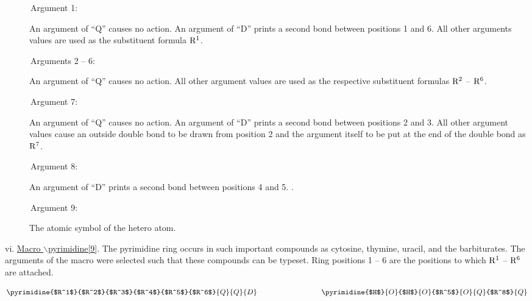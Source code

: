  \begin{description}
 \item[{\rm \ \ \ \ \ \ Argument 1:}] An argument of ``Q'' causes
      no action. An argument of ``D'' prints a second bond
      between positions 1 and 6. All other arguments values
      are used as the substituent formula ${\rm R^1}$.
 \item[{\rm \ \ \ \ \ \ Arguments 2 -- 6:}] An argument of ``Q''
      causes no action. All other argument values are used as    
      the respective substituent formulas ${\rm R^2}$ -- 
      ${\rm R^6}$.
 \item[{\rm \ \ \ \ \ \ Argument 7:}] An argument of ``Q'' causes
      no action. An argument of ``D'' prints a second bond
      between positions 2 and 3. All other argument values
      cause an outside double bond to be drawn from position
      2 and the argument itself to be put at the end of the
      double bond as ${\rm R^7}$.
 \item[{\rm \ \ \ \ \ \ Argument 8:}] An argument of ``D'' prints
      a second bond between positions 4 and 5. \ri .
 \item[{\rm \ \ \ \ \ \ Argument 9:}] The atomic symbol of the
      hetero atom.
 \end{description}

 \vspace{\len mm}
 \indent vi. \underline{Macro $\backslash $pyrimidine[9]}.
      The pyrimidine ring occurs in such important compounds
      as cytosine, thymine, uracil, and the barbiturates.
      The arguments of the macro were selected such that
      these compounds can be typeset. Ring positions 1 -- 6
      are the positions to which ${\rm R^1}$ -- ${\rm R^6}$
      are attached.

 \[ \pyrimidine{$R^1$}{$R^2$}{$R^3$}{$R^4$}{$R^5$}{$R^6$}
               {Q}{Q}{D}
    \hspace{3cm}
    \pyrimidine{$H$}{O}{$H$}{O}{$R^5$}{O}{Q}{$R^8$}{Q} \]

